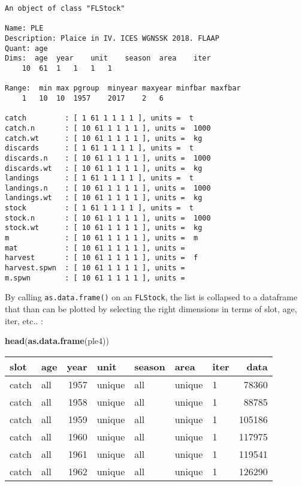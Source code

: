 \documentclass[]{article}
\newenvironment{Shaded}{\begin{snugshade}}{\end{snugshade}}
\newcommand{\KeywordTok}[1]{\textcolor[rgb]{0.13,0.29,0.53}{\textbf{{#1}}}}
\newcommand{\NormalTok}[1]{{#1}}
\begin{document}
\begin{verbatim}
An object of class "FLStock"

Name: PLE 
Description: Plaice in IV. ICES WGNSSK 2018. FLAAP 
Quant: age 
Dims:  age  year    unit    season  area    iter
    10  61  1   1   1   1   

Range:  min max pgroup  minyear maxyear minfbar maxfbar 
    1   10  10  1957    2017    2   6   

catch         : [ 1 61 1 1 1 1 ], units =  t 
catch.n       : [ 10 61 1 1 1 1 ], units =  1000 
catch.wt      : [ 10 61 1 1 1 1 ], units =  kg 
discards      : [ 1 61 1 1 1 1 ], units =  t 
discards.n    : [ 10 61 1 1 1 1 ], units =  1000 
discards.wt   : [ 10 61 1 1 1 1 ], units =  kg 
landings      : [ 1 61 1 1 1 1 ], units =  t 
landings.n    : [ 10 61 1 1 1 1 ], units =  1000 
landings.wt   : [ 10 61 1 1 1 1 ], units =  kg 
stock         : [ 1 61 1 1 1 1 ], units =  t 
stock.n       : [ 10 61 1 1 1 1 ], units =  1000 
stock.wt      : [ 10 61 1 1 1 1 ], units =  kg 
m             : [ 10 61 1 1 1 1 ], units =  m 
mat           : [ 10 61 1 1 1 1 ], units =   
harvest       : [ 10 61 1 1 1 1 ], units =  f 
harvest.spwn  : [ 10 61 1 1 1 1 ], units =   
m.spwn        : [ 10 61 1 1 1 1 ], units =   
\end{verbatim}

By calling \texttt{as.data.frame()} on an \texttt{FLStock}, the list is
collapsed to a dataframe that than can be plotted by selecting the right
dimensions in terms of slot, age, iter, etc.. :

\begin{Shaded}
\begin{Highlighting}[]
\KeywordTok{head}\NormalTok{(}\KeywordTok{as.data.frame}\NormalTok{(ple4))}
\end{Highlighting}
\end{Shaded}

\begin{longtable}[c]{@{}llrllllr@{}}
\toprule
slot & age & year & unit & season & area & iter & data\tabularnewline
\midrule
\endhead
catch & all & 1957 & unique & all & unique & 1 & 78360\tabularnewline
catch & all & 1958 & unique & all & unique & 1 & 88785\tabularnewline
catch & all & 1959 & unique & all & unique & 1 & 105186\tabularnewline
catch & all & 1960 & unique & all & unique & 1 & 117975\tabularnewline
catch & all & 1961 & unique & all & unique & 1 & 119541\tabularnewline
catch & all & 1962 & unique & all & unique & 1 & 126290\tabularnewline
\bottomrule
\end{longtable}
\end{document}
